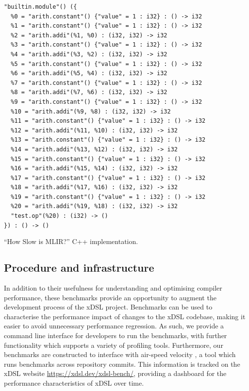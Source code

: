 \begin{code}
   \centering
    \begin{verbatim}
"builtin.module"() ({
  %0 = "arith.constant"() {"value" = 1 : i32} : () -> i32
  %1 = "arith.constant"() {"value" = 1 : i32} : () -> i32
  %2 = "arith.addi"(%1, %0) : (i32, i32) -> i32
  %3 = "arith.constant"() {"value" = 1 : i32} : () -> i32
  %4 = "arith.addi"(%3, %2) : (i32, i32) -> i32
  %5 = "arith.constant"() {"value" = 1 : i32} : () -> i32
  %6 = "arith.addi"(%5, %4) : (i32, i32) -> i32
  %7 = "arith.constant"() {"value" = 1 : i32} : () -> i32
  %8 = "arith.addi"(%7, %6) : (i32, i32) -> i32
  %9 = "arith.constant"() {"value" = 1 : i32} : () -> i32
  %10 = "arith.addi"(%9, %8) : (i32, i32) -> i32
  %11 = "arith.constant"() {"value" = 1 : i32} : () -> i32
  %12 = "arith.addi"(%11, %10) : (i32, i32) -> i32
  %13 = "arith.constant"() {"value" = 1 : i32} : () -> i32
  %14 = "arith.addi"(%13, %12) : (i32, i32) -> i32
  %15 = "arith.constant"() {"value" = 1 : i32} : () -> i32
  %16 = "arith.addi"(%15, %14) : (i32, i32) -> i32
  %17 = "arith.constant"() {"value" = 1 : i32} : () -> i32
  %18 = "arith.addi"(%17, %16) : (i32, i32) -> i32
  %19 = "arith.constant"() {"value" = 1 : i32} : () -> i32
  %20 = "arith.addi"(%19, %18) : (i32, i32) -> i32
  "test.op"(%20) : (i32) -> ()
}) : () -> ()
    \end{verbatim}
    \caption{``How Slow is MLIR?'' C++ implementation.}
    \label{listing:ubenchmark-trait-checks-bench-mlir}
\end{code}



\subsection{Procedure and infrastructure}
\label{ssec:procedure-infrastructure}



In addition to their usefulness for understanding and optimising compiler performance, these benchmarks provide an opportunity to augment the development process of the xDSL project.
Benchmarks can be used to characterise the performance impact of changes to the xDSL codebase, making it easier to avoid unnecessary performance regression.
As such, we provide a command line interface for developers to run the benchmarks, with further functionality which supports a variety of profiling tools.
Furthermore, our benchmarks are constructed to interface with air-speed velocity \cite{michaeldroettboomAirspeedvelocityAsv2025}, a tool which runs benchmarks across repository commits. This information is tracked on the xDSL website \url{https://xdsl.dev/xdsl-bench/}, providing a dashboard for the performance characteristics of xDSL over time.


















